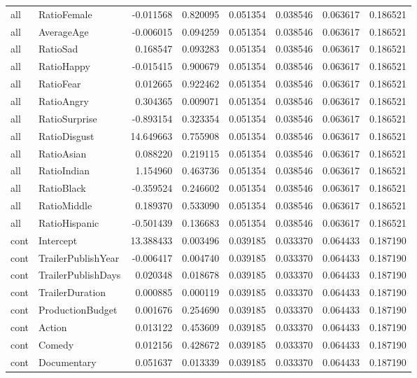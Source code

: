 \begin{tabular}{llrrrrrr}
all & RatioFemale & -0.011568 & 0.820095 & 0.051354 & 0.038546 & 0.063617 & 0.186521 \\
all & AverageAge & -0.006015 & 0.094259 & 0.051354 & 0.038546 & 0.063617 & 0.186521 \\
all & RatioSad & 0.168547 & 0.093283 & 0.051354 & 0.038546 & 0.063617 & 0.186521 \\
all & RatioHappy & -0.015415 & 0.900679 & 0.051354 & 0.038546 & 0.063617 & 0.186521 \\
all & RatioFear & 0.012665 & 0.922462 & 0.051354 & 0.038546 & 0.063617 & 0.186521 \\
all & RatioAngry & 0.304365 & 0.009071 & 0.051354 & 0.038546 & 0.063617 & 0.186521 \\
all & RatioSurprise & -0.893154 & 0.323354 & 0.051354 & 0.038546 & 0.063617 & 0.186521 \\
all & RatioDisgust & 14.649663 & 0.755908 & 0.051354 & 0.038546 & 0.063617 & 0.186521 \\
all & RatioAsian & 0.088220 & 0.219115 & 0.051354 & 0.038546 & 0.063617 & 0.186521 \\
all & RatioIndian & 1.154960 & 0.463736 & 0.051354 & 0.038546 & 0.063617 & 0.186521 \\
all & RatioBlack & -0.359524 & 0.246602 & 0.051354 & 0.038546 & 0.063617 & 0.186521 \\
all & RatioMiddle & 0.189370 & 0.533090 & 0.051354 & 0.038546 & 0.063617 & 0.186521 \\
all & RatioHispanic & -0.501439 & 0.136683 & 0.051354 & 0.038546 & 0.063617 & 0.186521 \\
cont & Intercept & 13.388433 & 0.003496 & 0.039185 & 0.033370 & 0.064433 & 0.187190 \\
cont & TrailerPublishYear & -0.006417 & 0.004740 & 0.039185 & 0.033370 & 0.064433 & 0.187190 \\
cont & TrailerPublishDays & 0.020348 & 0.018678 & 0.039185 & 0.033370 & 0.064433 & 0.187190 \\
cont & TrailerDuration & 0.000885 & 0.000119 & 0.039185 & 0.033370 & 0.064433 & 0.187190 \\
cont & ProductionBudget & 0.001676 & 0.254690 & 0.039185 & 0.033370 & 0.064433 & 0.187190 \\
cont & Action & 0.013122 & 0.453609 & 0.039185 & 0.033370 & 0.064433 & 0.187190 \\
cont & Comedy & 0.012156 & 0.428672 & 0.039185 & 0.033370 & 0.064433 & 0.187190 \\
cont & Documentary & 0.051637 & 0.013339 & 0.039185 & 0.033370 & 0.064433 & 0.187190 \\

\end{tabular}
